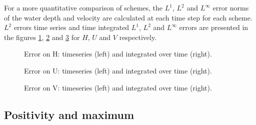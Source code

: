 For a more quantitative comparison of schemes, the $L^1$, $L^2$ and $L^\infty$ error norms 
of the water depth and velocity are calculated at each time step for each scheme. 
$L^2$ errors time series and time integrated $L^1$, $L^2$ and $L^\infty$ errors are presented in the figures \ref{fig:stoker:ErrNumH}, \ref{fig:stoker:ErrNumU} and \ref{fig:stoker:ErrNumV} for $H$, $U$ and $V$ respectively.

\begin{figure}[H]
\begin{minipage}[t]{0.45\textwidth}
 \centering
\end{minipage}%
\begin{minipage}[t]{0.55\textwidth}
 \centering
\end{minipage}
  \caption{Error on H: timeseries (left) and integrated over time (right).}
  \label{fig:stoker:ErrNumH}
\end{figure}

\begin{figure}[H]
\begin{minipage}[t]{0.45\textwidth}
 \centering
\end{minipage}%
\begin{minipage}[t]{0.55\textwidth}
 \centering
\end{minipage}
  \caption{Error on U: timeseries (left) and integrated over time (right).}
  \label{fig:stoker:ErrNumU}
\end{figure}

\begin{figure}[H]
\begin{minipage}[t]{0.45\textwidth}
 \centering
\end{minipage}%
\begin{minipage}[t]{0.55\textwidth}
 \centering
\end{minipage}
  \caption{Error on V: timeseries (left) and integrated over time (right).}
  \label{fig:stoker:ErrNumV}
\end{figure}

\subsection{Positivity and maximum}

